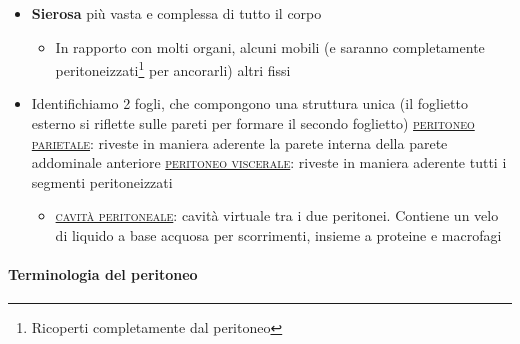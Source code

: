 \documentclass[italian,]{article}
\providecommand{\tightlist}{%
  \setlength{\itemsep}{0pt}\setlength{\parskip}{0pt}}
\renewcommand{\a}[1]{\underline{\textsc{#1}}}
\begin{document}
\begin{itemize}
\tightlist
\item
  \textbf{Sierosa} più vasta e complessa di tutto il corpo

  \begin{itemize}
  \tightlist
  \item
    In rapporto con molti organi, alcuni mobili (e saranno completamente
    peritoneizzati\footnote{Ricoperti completamente dal peritoneo} per
    ancorarli) altri fissi
  \end{itemize}
\item
  Identifichiamo 2 fogli, che compongono una struttura unica (il
  foglietto esterno si riflette sulle pareti per formare il secondo
  foglietto) \a{peritoneo parietale}: riveste in maniera aderente la
  parete interna della parete addominale anteriore
  \a{peritoneo viscerale}: riveste in maniera aderente tutti i segmenti
  peritoneizzati

  \begin{itemize}
  \tightlist
  \item
    \a{cavità peritoneale}: cavità virtuale tra i due peritonei.
    Contiene un velo di liquido a base acquosa per scorrimenti, insieme
    a proteine e macrofagi
  \end{itemize}
\end{itemize}

\hypertarget{terminologia-del-peritoneo}{%
\paragraph{Terminologia del
peritoneo}\label{terminologia-del-peritoneo}}
\end{document}
